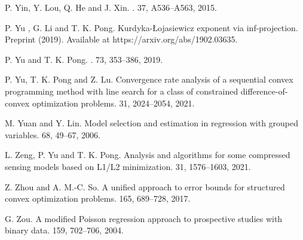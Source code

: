 \documentclass[10pt]{article}
\numberwithin{equation}{section}
\begin{document}
\begin{thebibliography}{99}
P. Yin, Y. Lou, Q. He and J. Xin.
.
 37, A536--A563, 2015.

P. Yu , G. Li and T. K. Pong.
\newblock Kurdyka-{\L}ojasiewicz exponent via inf-projection.
\newblock Preprint (2019). Available at https://arxiv.org/abs/1902.03635.

P. Yu and T. K. Pong.
.
 73, 353--386, 2019.

{\color{blue}
P. Yu,  T. K. Pong and Z. Lu.
\newblock Convergence rate analysis of a sequential convex programming method with line search for a class of constrained difference-of-convex optimization problems.
 31, 2024--2054, 2021.}

M. Yuan and Y. Lin.
\newblock Model selection and estimation in regression with grouped variables.
 68, 49--67, 2006.


{\color{blue}
L. Zeng, P. Yu and T. K. Pong.
\newblock Analysis and algorithms for some compressed sensing models based on L1/L2 minimization.
 31, 1576--1603, 2021.}

Z. Zhou and A. M.-C. So.
\newblock A unified approach to error bounds for structured convex optimization problems.
 165, 689--728, 2017.

G. Zou.
\newblock A modified Poisson regression approach to prospective studies with binary data.
 159, 702--706, 2004.

\end{thebibliography}
\end{document}
